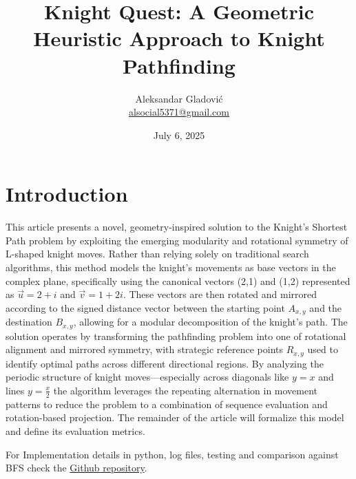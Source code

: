 \documentclass[a4paper, 12pt]{article}
\title{Knight Quest: A Geometric Heuristic Approach to Knight Pathfinding} %
\author{Aleksandar Gladović  \\[0.2cm] \href{mailto:alsocial5371@gmail.com}{alsocial5371@gmail.com}}        %
\date{July 6, 2025}                 %
\begin{document}
\maketitle       %
\tableofcontents %
\newpage         %


\section{Introduction}
This article presents a novel, geometry-inspired solution to the Knight’s Shortest Path problem by exploiting the 
emerging modularity and rotational symmetry of L-shaped knight moves. Rather than relying solely on traditional search 
algorithms, this method models the knight’s movements as base vectors in the complex plane, specifically using the 
canonical vectors (2,1) and (1,2) represented as \( \overrightarrow{u} = 2 + i \) and \( \overrightarrow{v} = 1 + 2i \).
These vectors are then rotated and mirrored according to the signed distance vector between the starting point \( A_{x,y} \)
and the destination \( B_{x,y} \), allowing for a modular decomposition of the knight's path. The solution operates by 
transforming the pathfinding problem into one of rotational alignment and mirrored symmetry, with strategic reference points
\( R_{x,y} \) used to identify optimal paths across different directional regions. By analyzing the periodic structure of 
knight moves—especially across diagonals like \( y = x \) and lines \( y = \frac{x}{2} \) the algorithm leverages the 
repeating alternation in movement patterns to reduce the problem to a combination of sequence evaluation and rotation-based 
projection. The remainder of the article will formalize this model and define its evaluation metrics.

\vspace{1em}
\noindent For Implementation details in python, log files, testing and comparison against BFS check the 
\href{https://github.com/WhyNotAleksandar/knight-quest}{Github repository}.
\newpage

\end{document}
